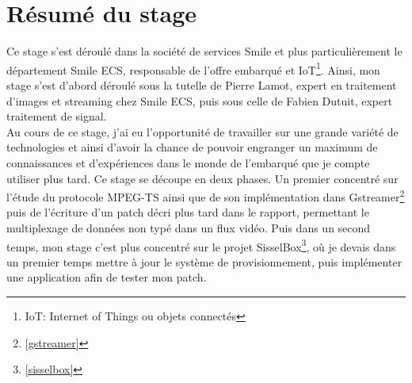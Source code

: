 \chapter*{Résumé du stage}
Ce stage s'est déroulé dans la société de services Smile et plus particulièrement le département Smile ECS, responsable de l'offre embarqué et IoT\footnote{IoT: Internet of Things ou objets connectés}. Ainsi, mon stage s'est d'abord déroulé sous la tutelle de Pierre Lamot, expert en traitement d'images et streaming chez Smile ECS, puis sous celle de Fabien Dutuit, expert traitement de signal.
\\
Au cours de ce stage, j'ai eu l'opportunité de travailler sur une grande variété de technologies et ainsi d'avoir la chance de pouvoir engranger un maximum de connaissances et d'expériences dans le monde de l'embarqué que je compte utiliser plus tard.
\newline
\newline
Ce stage se découpe en deux phases. Un premier concentré sur l'étude du protocole MPEG-TS ainsi que de son implémentation dans Gstreamer\footnote{\ref{gstreamer}} puis de l'écriture d'un patch décri plus tard dans le rapport, permettant le multiplexage de données non typé dans un flux vidéo. Puis dans un second temps, mon stage c'est plus concentré sur le projet SisselBox\footnote{\ref{sisselbox}}, où je devais dans un premier temps mettre à jour le système de provisionnement, puis implémenter une application afin de tester mon patch.

